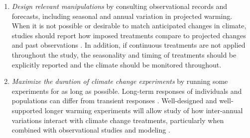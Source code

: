 \documentclass{article}
\begin{document}
\begin{enumerate}
\item\textit{Design relevant manipulations} by consulting observational records and forecasts, including seasonal and annual variation in projected warming. When it is not possible or desirable to match anticipated changes in climate, studies should report how imposed treatments compare to projected changes and past observations \citep[see, e.g.,][]{hoover2014}. In addition, if continuous treatments are not applied throughout the study, the seasonality and timing of treatments should be explicitly reported and the climate should be monitored throughout.

\item\textit{Maximize the duration of climate change experiments} by running some experiments for as long as possible. Long-term responses of individuals and populations can differ from transient responses \citep{saleska2002,franklin1989,giasson2013,harte2015}. Well-designed and well-supported longer warming experiments will allow study of how inter-annual variations interact with climate change treatments, particularly when combined with observational studies and modeling \citep{luo2011}.

\end{enumerate}

\end{document}
